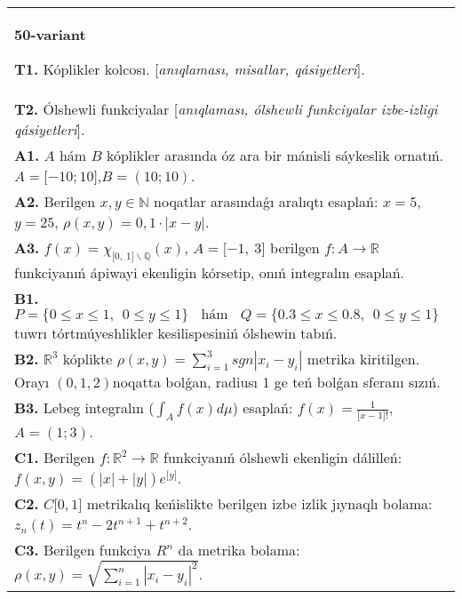 \documentclass{article}
\begin{document}
\begin{tabular}{m{17cm}}
\textbf{50-variant}
\newline

\textbf{T1.} Kóplikler kolcosı. [\textit{anıqlaması, misallar, qásiyetleri}]. \\
\textbf{T2.} Ólshewli funkciyalar [\textit{anıqlaması, ólshewli funkciyalar izbe-izligi qásiyetleri}]. \\
\textbf{A1.} \(A\) hám \(B\) kóplikler arasında óz ara bir mánisli sáykeslik ornatıń. \(A = \lbrack - 10;10\rbrack\),\(B = (10;10)\). \\
\textbf{A2.} Berilgen \(x,y\mathbb{\in N}\) noqatlar arasındaǵı aralıqtı esaplań: \(x = 5\), \(y = 25\), \(\rho(x,y) = 0,1 \cdot |x - y|\). \\
\textbf{A3.} \(f(x) = \chi_{\lbrack 0,\ 1\rbrack\backslash\mathbb{Q}}(x)\), \(A = \lbrack - 1,\ 3\rbrack\) berilgen \(f:A\rightarrow\mathbb{R}\) funkciyanıń ápiwayi ekenligin kórsetip, onıń integralın esaplań. \\
\textbf{B1.} \(P = \{ 0 \leq x \leq 1,\ \ 0 \leq y \leq 1\}\ \ \ \ \text{hám}\ \ \ \ Q = \{ 0.3 \leq x \leq 0.8,\ \ 0 \leq y \leq 1\}\) tuwrı tórtmúyeshlikler kesilispesiniń ólshewin tabıń. \\
\textbf{B2.} \(\mathbb{R}^{3}\) kóplikte \(\rho(x,y) = \sum_{i = 1}^{3}{sgn\left| x_{i} - y_{i} \right|}\) metrika kiritilgen. Orayı \((0,1,2)\)noqatta bolǵan, radiusı 1 ge teń bolǵan sferanı sızıń. \\
\textbf{B3.} Lebeg integralın (\(\int_{A}^{}{f(x)d\mu}\)) esaplań: \(f(x) = \frac{1}{\lbrack x - 1\rbrack!}\), \(A = (1;3)\). \\
\textbf{C1.} Berilgen \(f:\mathbb{R}^{2}\mathbb{\rightarrow R}\) funkciyanıń ólshewli ekenligin dálilleń: \(f(x,y) = \left( |x| + |y| \right)e^{\lbrack y\rbrack}\). \\
\textbf{C2.} \(C\lbrack 0,1\rbrack\) metrikalıq keńislikte berilgen izbe izlik jıynaqlı bolama: \(z_{n}(t) = t^{n} - 2t^{n + 1} + t^{n + 2}\). \\
\textbf{C3.} Berilgen funkciya \(R^{n}\) da metrika bolama: \(\rho(x,y) = \sqrt{{\sum_{i = 1}^{n}\left| x_{i} - y_{i} \right|^{2}}}\). \\

\end{tabular}
\vspace{1cm}
\end{document}
